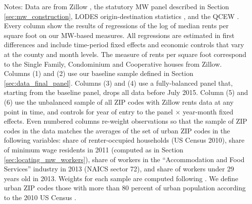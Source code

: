 \begin{landscape}
\begin{table}[hbt!]
    \begin{minipage}{.95\linewidth} \footnotesize
        \vspace{2mm}
        Notes:
        Data are from Zillow \parencite{ZillowData}, 
        the statutory MW panel described in Section \ref{sec:mw_construction}, 
        LODES origin-destination statistics \parencite{CensusLODES},
        and the QCEW \parencite{QCEW}.
        Every column show the results of regressions of the log of 
        median rents per square foot on our MW-based measures.
        All regressions are estimated in first differences and include 
        time-period fixed effects and economic controls that vary at the 
        county and month levels.
        The measure of rents per square foot correspond to the Single Family, 
        Condominium and Cooperative houses from Zillow.
        Columns (1) and (2) use our baseline sample defined in Section 
        \ref{sec:data_final_panel}.
        Columns (3) and (4) use a fully-balanced panel that, starting from the 
        baseline panel, drops all data before July 2015.
        Column (5) and (6) use the unbalanced sample of all ZIP codes with 
        Zillow rents data at any point in time, and controls for year of entry 
        to the panel $\times$ year-month fixed effects.
        Even numbered columns re-weight observations so that the sample of 
        ZIP codes in the data matches the averages of the set of urban 
        ZIP codes in the following variables:
        share of renter-occupied households (US Census 2010),
        share of minimum wage residents in 2011 (computed as in Section 
        \ref{sec:locating_mw_workers}),
        share of workers in the ``Accommodation and Food Services'' industry 
        in 2013 (NAICS sector 72),
        and share of workers under 29 years old in 2013.
        Weights for each sample are computed following \textcite{Hainmueller2012}.
        We define urban ZIP codes those with more than 80 percent of urban
        population according to the 2010 US Census \parencite{CensusDecennial}. 
    \end{minipage}
\end{table}
\end{landscape}
